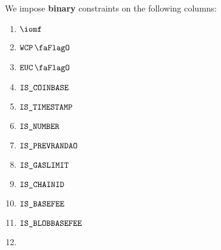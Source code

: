 We impose \textbf{binary} constraints on the following columns:
\begin{multicols}{4}
	\begin{enumerate}
		\item $\iomf$
		\item $\wcpFlag$
		\item $\eucFlag$
		\item $\texttt{IS\_COINBASE}$
		\item $\texttt{IS\_TIMESTAMP}$
		\item $\texttt{IS\_NUMBER}$
		\item $\texttt{IS\_PREVRANDAO}$
		\item $\texttt{IS\_GASLIMIT}$
		\item $\texttt{IS\_CHAINID}$
		\item $\texttt{IS\_BASEFEE}$
		\item $\texttt{IS\_BLOBBASEFEE}$
		\item[\vspace{\fill}]
	\end{enumerate}
\end{multicols}

